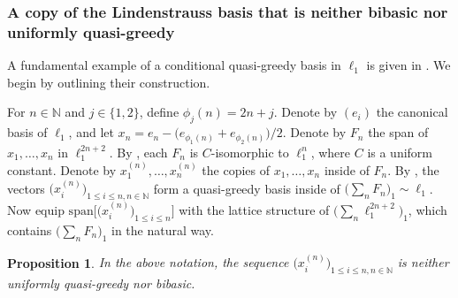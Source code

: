 \documentclass[12pt,leqno]{amsart}
\newtheorem{proposition}[theorem]{Proposition}
\numberwithin{equation}{section}
\theoremstyle{definition}
\def\N{{\mathbb N}}
\begin{document}
\subsubsection{A copy of the  Lindenstrauss basis that is neither bibasic nor uniformly quasi-greedy}\label{ss:destroy_Lind}
A fundamental example of a conditional quasi-greedy basis in $\ell_1$ is given in \cite{DM}. We begin by outlining their construction.
\medskip

For $n \in \N$ and $j \in \{1,2\}$, define $\phi_j(n) = 2n+j$. Denote by $(e_i)$ the canonical basis of $\ell_1$, and let $x_n = e_n - \big(e_{\phi_1(n)} + e_{\phi_2(n)}\big)/2$.
Denote by $F_n$ the span of $x_1, \ldots, x_n$ in $\ell_1^{2n+2}$.
By \cite{DM}, each $F_n$ is $C$-isomorphic to $\ell_1^n$, where $C$ is a uniform constant.
Denote by $x_1^{(n)}, \ldots, x_n^{(n)}$ the copies of $x_1, \ldots, x_n$ inside of $F_n$.
By \cite{DM}, the vectors $\big(x_i^{(n)}\big)_{1 \leq i \leq n, n \in \N}$ form a quasi-greedy basis inside of $\big( \sum_n F_n \big)_1 \sim \ell_1$. Now equip ${\mathrm{span}} \big[ \big(x_i^{(n)}\big)_{1 \leq i \leq n} \big]$ with the lattice structure of $\big( \sum_n \ell_1^{2n+2} \big)_1$, which contains $\big( \sum_n F_n \big)_1$ in the natural way.
\begin{proposition}\label{p:destroy_Lind}
 In the above notation, the sequence $\big(x_i^{(n)}\big)_{1 \leq i \leq n, n \in \N}$ is neither uniformly quasi-greedy nor bibasic.
\end{proposition}
\end{document}

